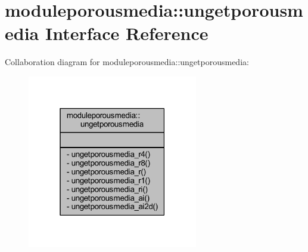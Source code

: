 \hypertarget{interfacemoduleporousmedia_1_1ungetporousmedia}{}\section{moduleporousmedia\+:\+:ungetporousmedia Interface Reference}
\label{interfacemoduleporousmedia_1_1ungetporousmedia}


Collaboration diagram for moduleporousmedia\+:\+:ungetporousmedia\+:\nopagebreak
\begin{figure}[H]
\begin{center}
\leavevmode
\includegraphics[width=211pt]{interfacemoduleporousmedia_1_1ungetporousmedia__coll__graph}
\end{center}
\end{figure}
